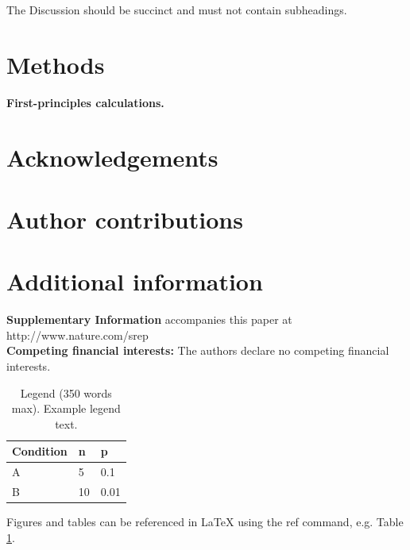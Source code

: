 \documentclass[fleqn,10pt]{wlscirep}
\begin{document}
The Discussion should be succinct and must not contain subheadings.

\section*{Methods}
\textbf{First-principles calculations.}

%


\section*{Acknowledgements}



\section*{Author contributions}


\section*{Additional information}

\textbf{Supplementary Information} accompanies this paper at http://www.nature.com/srep \\
\newline
\textbf{Competing financial interests:} The authors declare no competing financial interests.



\begin{table}[ht]
\centering
\begin{tabular}{|l|l|l|}
\hline
Condition & n & p \\
\hline
A & 5 & 0.1 \\
\hline
B & 10 & 0.01 \\
\hline
\end{tabular}
\caption{\label{tab:example}Legend (350 words max). Example legend text.}
\end{table}

Figures and tables can be referenced in LaTeX using the ref command, e.g. Table \ref{tab:example}.
\end{document}
